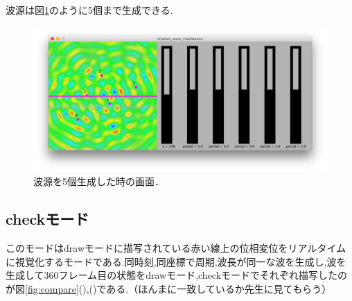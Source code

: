 波源は図\ref{fig:5wave}のように5個まで生成できる.

\begin{figure}[htbp]
 \begin{center}
  \includegraphics[width=\linewidth]{../result/5wave.png}
 \end{center}
 \caption{波源を5個生成した時の画面．}
 \label{fig:5wave}
\end{figure}

\newpage
\subsection{checkモード}
このモードはdrawモードに描写されている赤い線上の位相変位をリアルタイムに視覚化するモードである.同時刻,同座標で周期,波長が同一な波を生成し,波を生成して360フレーム目の状態をdrawモード,checkモードでそれぞれ描写したのが図\ref{fig:compare}(),()である.（ほんまに一致しているか先生に見てもらう）


